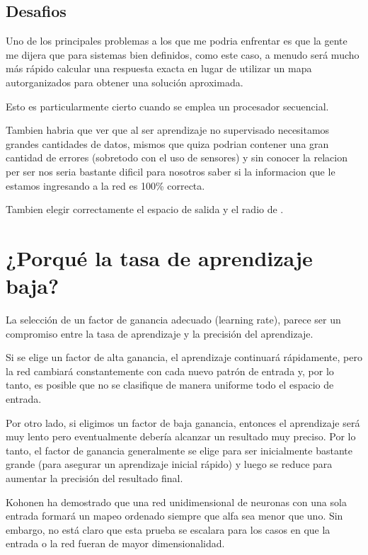 \documentclass[fleqn, journal, onecolumn]{IEEEtran}             %
\newcommand \Quote              {\qq}                           %
\theoremstyle{break}                                            %
\begin{document}
    \subsection{Desafios}

      Uno de los principales problemas a los que me podria enfrentar es que la gente me dijera
      que para sistemas bien definidos, como este caso,  a menudo será mucho más rápido calcular
      una respuesta exacta en lugar de utilizar un mapa autorganizados para obtener una 
      solución aproximada. 
      
      Esto es particularmente cierto cuando se emplea un procesador secuencial.

      Tambien habria que ver que al ser aprendizaje no supervisado necesitamos grandes cantidades de 
      datos, mismos que quiza podrian contener una gran cantidad de errores (sobretodo con el uso de
      sensores) y sin conocer la relacion per ser nos seria bastante dificil para nosotros saber si 
      la informacion que le estamos ingresando a la red es 100\% correcta.

      Tambien elegir correctamente el espacio de salida y el radio de \Quote{vecindad}.

  \section{¿Porqué la tasa de aprendizaje baja?}

    La selección de un factor de ganancia adecuado (learning rate), parece ser un compromiso entre la
    tasa de aprendizaje y la precisión del aprendizaje. 
    
    Si se elige un factor de alta ganancia, el aprendizaje continuará rápidamente, 
    pero la red cambiará constantemente con cada nuevo patrón de entrada y, por lo tanto, 
    es posible que no se clasifique de manera uniforme todo el espacio de entrada. 
    
    Por otro lado, si eligimos un factor de baja ganancia, entonces el 
    aprendizaje será muy lento pero eventualmente debería alcanzar un resultado muy preciso. 
    Por lo tanto, el factor de ganancia generalmente se elige para ser inicialmente bastante
    grande (para asegurar un aprendizaje inicial rápido) y luego se reduce para aumentar la
    precisión del resultado final.

    Kohonen ha demostrado que una red unidimensional de neuronas con una sola entrada formará 
    un mapeo ordenado siempre que alfa sea menor que uno. 
    Sin embargo, no está claro que esta prueba se escalara para los casos en que la entrada o 
    la red fueran de mayor dimensionalidad. 
    
\end{document}
